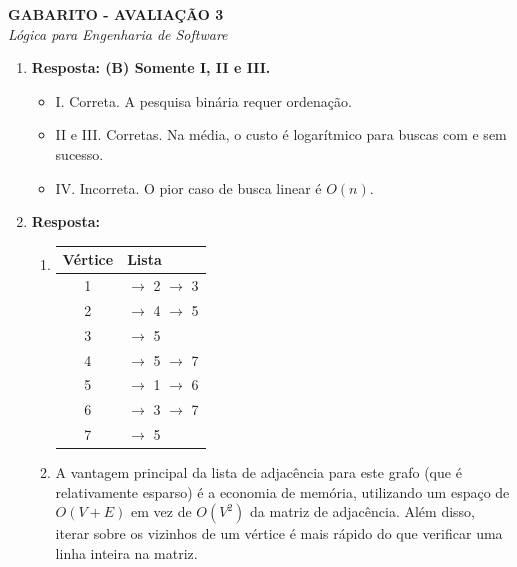 \documentclass[12pt,a4paper]{article}
\begin{document}
\begin{center}
    \textbf{\Large GABARITO - AVALIAÇÃO 3} \\
    \textit{Lógica para Engenharia de Software}
\end{center}

\vspace{0.5cm} 

\begin{enumerate}

\item \textbf{Resposta: (B) Somente I, II e III.}
\begin{itemize}
    \item I. Correta. A pesquisa binária requer ordenação.
    \item II e III. Corretas. Na média, o custo é logarítmico para buscas com e sem sucesso.
    \item IV. Incorreta. O pior caso de busca linear é $O(n)$.
\end{itemize}

\item \textbf{Resposta:}
\begin{enumerate}[label=\alph*)]
    \item 
    \begin{tcolorbox}[colback=white, colframe=black, width=0.5\textwidth, boxrule=0.5pt, arc=0pt]
    \renewcommand{\arraystretch}{1.8}
    \begin{tabular}{c|l}
        \textbf{Vértice} & \textbf{Lista} \\ \hline
        1 & $\to$ 2 $\to$ 3 \\ \hline
        2 & $\to$ 4 $\to$ 5 \\ \hline
        3 & $\to$ 5 \\ \hline
        4 & $\to$ 5 $\to$ 7 \\ \hline
        5 & $\to$ 1 $\to$ 6 \\ \hline
        6 & $\to$ 3 $\to$ 7 \\ \hline
        7 & $\to$ 5 \\
    \end{tabular}
    \end{tcolorbox}
    \item A vantagem principal da lista de adjacência para este grafo (que é relativamente esparso) é a economia de memória, utilizando um espaço de $O(V + E)$ em vez de $O(V^2)$ da matriz de adjacência. Além disso, iterar sobre os vizinhos de um vértice é mais rápido do que verificar uma linha inteira na matriz.
\end{enumerate}


\end{enumerate}
\end{document}
